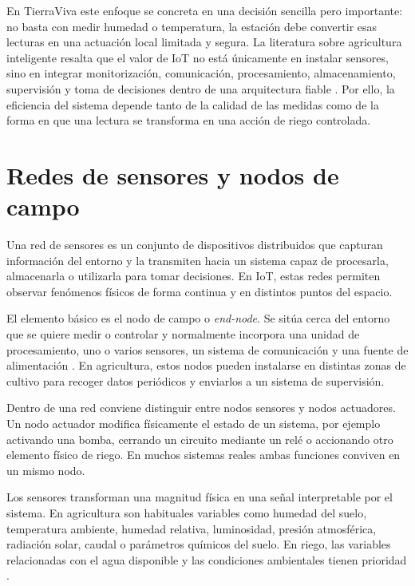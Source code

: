 En TierraViva este enfoque se concreta en una decisión sencilla pero importante: no basta con medir humedad o temperatura, la estación debe convertir esas lecturas en una actuación local limitada y segura. La literatura sobre agricultura inteligente resalta que el valor de IoT no está únicamente en instalar sensores, sino en integrar monitorización, comunicación, procesamiento, almacenamiento, supervisión y toma de decisiones dentro de una arquitectura fiable \cite{shafi2019,soussi2024smart,abioye2020}. Por ello, la eficiencia del sistema depende tanto de la calidad de las medidas como de la forma en que una lectura se transforma en una acción de riego controlada.

\section{Redes de sensores y nodos de campo}
\label{sec:redes_sensores_nodos_campo}

Una red de sensores es un conjunto de dispositivos distribuidos que capturan información del entorno y la transmiten hacia un sistema capaz de procesarla, almacenarla o utilizarla para tomar decisiones. En IoT, estas redes permiten observar fenómenos físicos de forma continua y en distintos puntos del espacio.

El elemento básico es el nodo de campo o \textit{end-node}. Se sitúa cerca del entorno que se quiere medir o controlar y normalmente incorpora una unidad de procesamiento, uno o varios sensores, un sistema de comunicación y una fuente de alimentación \cite{hanes2017iot}. En agricultura, estos nodos pueden instalarse en distintas zonas de cultivo para recoger datos periódicos y enviarlos a un sistema de supervisión.

Dentro de una red conviene distinguir entre nodos sensores y nodos actuadores. Un nodo actuador modifica físicamente el estado de un sistema, por ejemplo activando una bomba, cerrando un circuito mediante un relé o accionando otro elemento físico de riego. En muchos sistemas reales ambas funciones conviven en un mismo nodo.

Los sensores transforman una magnitud física en una señal interpretable por el sistema. En agricultura son habituales variables como humedad del suelo, temperatura ambiente, humedad relativa, luminosidad, presión atmosférica, radiación solar, caudal o parámetros químicos del suelo. En riego, las variables relacionadas con el agua disponible y las condiciones ambientales tienen prioridad \cite{garcia2020}.


